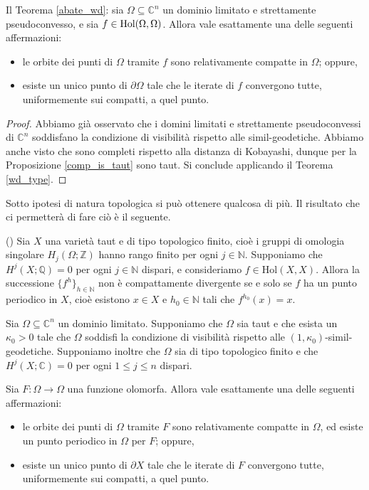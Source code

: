 \begin{cor}
    Il Teorema \ref{abate_wd}: sia $\Omega \subseteq \mathbb{C}^n$ un dominio limitato e strettamente pseudoconvesso, e sia $f \in \textnormal{Hol}(\Omega,\Omega)$. Allora vale esattamente una delle seguenti affermazioni:
    \begin{itemize}
        \item le orbite dei punti di $\Omega$ tramite $f$ sono relativamente compatte in $\Omega$; oppure,
        \item esiste un unico punto di $\partial\Omega$ tale che le iterate di $f$ convergono tutte, uniformemente sui compatti, a quel punto.
    \end{itemize}
\end{cor}

\begin{proof}
    Abbiamo già osservato che i domini limitati e strettamente pseudoconvessi di $\mathbb{C}^n$ soddisfano la condizione di visibilità rispetto alle simil-geodetiche. Abbiamo anche visto che sono completi rispetto alla distanza di Kobayashi, dunque per la Proposizione \ref{comp_is_taut} sono taut. Si conclude applicando il Teorema \ref{wd_type}.
\end{proof}

Sotto ipotesi di natura topologica si può ottenere qualcosa di più. Il risultato che ci permetterà di fare ciò è il seguente.

\begin{thm} \label{periodico}
    (\cite[Theorem 0.4]{A2}) Sia $X$ una varietà taut e di tipo topologico finito, cioè i gruppi di omologia singolare $H_j(\Omega;\mathbb{Z})$ hanno rango finito per ogni $j\in\mathbb{N}$. Supponiamo che $H^j(X;\mathbb{Q})=0$ per ogni $j\in\mathbb{N}$ dispari, e consideriamo $f\in\text{Hol}(X,X)$. Allora la successione $\{f^h\}_{h\in\mathbb{N}}$ non è compattamente divergente se e solo se $f$ ha un punto periodico in $X$, cioè esistono $x\in X$ e $h_0\in\mathbb{N}$ tali che $f^{h_0}(x)=x$.
\end{thm}

\begin{cor}
    Sia $\Omega\subseteq\mathbb{C}^n$ un dominio limitato. Supponiamo che $\Omega$ sia taut e che esista un $\kappa_0>0$ tale che $\Omega$ soddisfi la condizione di visibilità rispetto alle $(1,\kappa_0)$-simil-geodetiche. Supponiamo inoltre che $\Omega$ sia di tipo topologico finito e che $H^j(X;\mathbb{C})=0$ per ogni $1\le j\le n$ dispari.

    Sia $F:\Omega\longrightarrow\Omega$ una funzione olomorfa. Allora vale esattamente una delle seguenti affermazioni:
    \begin{itemize}
        \item le orbite dei punti di $\Omega$ tramite $F$ sono relativamente compatte in $\Omega$, ed esiste un punto periodico in $\Omega$ per $F$; oppure,
        \item esiste un unico punto di $\partial X$ tale che le iterate di $F$ convergono tutte, uniformemente sui compatti, a quel punto.
    \end{itemize}
\end{cor}

